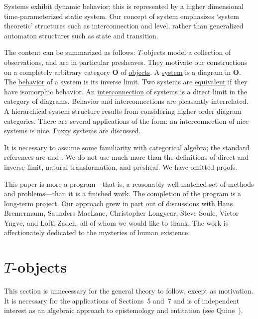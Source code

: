 \documentclass[10pt,a4paper,twocolumn]{article}
\newcommand{\Ocat}{\mathbf{O}}          %
\newcommand{\origpage}[1]{%
  \marginpar{\raggedright\footnotesize\itshape p.~#1}%
}
\begin{document}
\origpage{122}%
Systems exhibit dynamic behavior; this is represented by a higher dimensional time-parameterized static system.
Our concept of system emphasizes `system theoretic' structures such as interconnection and level, rather than generalized automaton structures such as state and transition.

The content can be summarized as follows: $T$-objects model a collection of observations, and are in particular presheaves.
They motivate our constructions on a completely arbitrary category $\Ocat$ of \underline{objects}.
A \underline{system} is a diagram in $\Ocat$.
The \underline{behavior} of a system is its inverse limit.
Two systems are \underline{equivalent} if they have isomorphic behavior.
An \underline{interconnection} of systems is a direct limit in the category of diagrams.
Behavior and interconnections are pleasantly interrelated.
A hierarchical system structure results from considering higher order diagram categories.
There are several applications of the form: an interconnection of nice systems is nice.
Fuzzy systems are discussed.

It is necessary to assume some familiarity with categorical algebra; the
standard references are \cite{MacLane} and \cite{Mitchell}.
We do not use much more than the definitions of direct and inverse limit, natural
transformation, and presheaf.
We have omitted proofs.

This paper is more a program---that is, a reasonably well matched set of
methods and problems---than it is a finished work.
The completion of the program is a long-term project.
Our approach grew in part out of discussions with Hans Bremermann, Saunders MacLane, Christopher Longyear, Steve Soule, Victor Yngve, and Lofti Zadeh, all of whom we would like to thank.
The work is affectionately dedicated to the mysteries of human existence.

\section{\texorpdfstring{$T$-objects}{T-objects}}

This section is unnecessary for the general theory to follow, except as
motivation.
It is necessary for the applications of Sections~5 and~7 and is
of independent interest as an algebraic approach to epistemology and
entitation (see Quine~\cite{Quine}).
\end{document}
